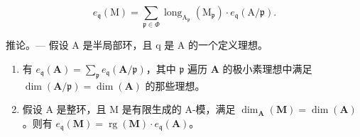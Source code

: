 \[
e _ {\mathfrak {q}} (\mathrm{M}) = \sum_ {\mathfrak {p} \in \Phi} \operatorname{long} _ {\mathrm{A} _ {\mathfrak {p}}} (\mathrm{M} _ {\mathfrak {p}}) \cdot e _ {\mathfrak {q}} (\mathrm{A} / \mathfrak {p}).
\]

推论。— 假设 A 是半局部环，且 q 是 A 的一个定义理想。

\begin{enumerate}
\def\labelenumi{\alph{enumi})}
\item
  有 \(e_{\mathfrak{q}}(\mathbf{A}) = \sum_{\mathfrak{p}} e_{\mathfrak{q}}(\mathbf{A}/\mathfrak{p})\)，其中 \(\mathfrak{p}\) 遍历 \(\mathbf{A}\) 的极小素理想中满足 \(\dim(\mathbf{A}/\mathfrak{p}) = \dim(\mathbf{A})\) 的那些理想。
\item
  假设 A 是整环，且 M 是有限生成的 A-模，满足 \(\dim_{\mathbf{A}}(\mathbf{M}) = \dim(\mathbf{A})\)。则有 \(e_{\mathfrak{q}}(\mathbf{M}) = \operatorname{rg}(\mathbf{M}) \cdot e_{\mathfrak{q}}(\mathbf{A})\)。
\end{enumerate}

